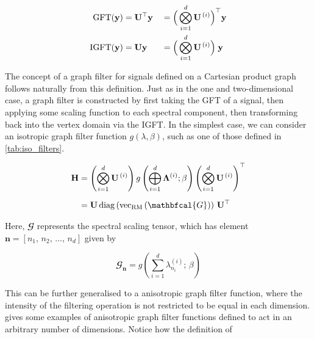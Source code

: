 \begin{alignat}{2}
\label{eq:gft_nd}
    \text{GFT}(\mathbf{y}) & = \mathbf{U}^\top \mathbf{y} && = \Big(  \bigotimes_{i=1}^d  \mathbf{U}^{\,(i)} \Big)^\top \mathbf{y} \\
\label{eq:igft_nd}
    \text{IGFT}(\mathbf{y}) & = \mathbf{U} \mathbf{y} && = \Big(  \bigotimes_{i=1}^d  \mathbf{U}^{\,(i)} \Big) \; \mathbf{y} 
\end{alignat}

The concept of a graph filter for signals defined on a Cartesian product graph follows naturally from this definition. Just as in the one and two-dimensional case, a graph filter is constructed by first taking the GFT of a signal, then applying some scaling function to each spectral component, then transforming back into the vertex domain via the IGFT. In the simplest case, we can consider an isotropic graph filter function $g(\lambda, \beta)$, such as one of those defined in \cref{tab:iso_filters}. 


\begin{align}
    \label{eq:H_def_dd}
    \HH &= \left( \bigotimes_{i=1}^d  \U^{\,(i)} \right) g\left(\bigoplus_{i=1}^d \LAM^{(i)}; \beta \right) \left(\bigotimes_{i=1}^d  \U^{\,(i)} \right)^\top \notag \\[0.2cm]
        &= \U \, \diag{\vecrm{\mathbfcal{G}}} \, \U^\top
\end{align}


Here, $\mathbfcal{G}$ represents the spectral scaling tensor, which has element $\mathbf{n} = [n_1,\, n_2,\, ...,\, n_d]$ given by 

\begin{equation}
    \label{eq:Gn_dd1}
    \mathbfcal{G}_{\mathbf{n}} = g\left(\sum_{i=1}^d \lambda^{(i)}_{n_i}; \, \beta\right)
\end{equation}

This can be further generalised to a anisotropic graph filter function, where the intensity of the filtering operation is not restricted to be equal in each dimension.  gives some examples of anisotropic graph filter functions defined to act in an arbitrary number of dimensions. Notice how the definition of  

